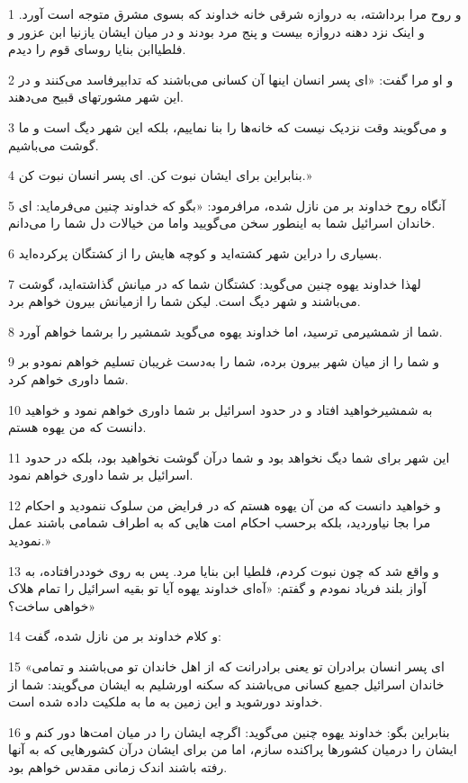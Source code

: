 \par 1 و روح مرا برداشته، به دروازه شرقی خانه خداوند که بسوی مشرق متوجه است آورد. و اینک نزد دهنه دروازه بیست و پنج مرد بودند و در میان ایشان یازنیا ابن عزور و فلطیاابن بنایا روسای قوم را دیدم.
\par 2 و او مرا گفت: «ای پسر انسان اینها آن کسانی می‌باشند که تدابیرفاسد می‌کنند و در این شهر مشورتهای قبیح می‌دهند.
\par 3 و می‌گویند وقت نزدیک نیست که خانه‌ها را بنا نماییم، بلکه این شهر دیگ است و ما گوشت می‌باشیم.
\par 4 بنابراین برای ایشان نبوت کن. ای پسر انسان نبوت کن.»
\par 5 آنگاه روح خداوند بر من نازل شده، مرافرمود: «بگو که خداوند چنین می‌فرماید: ای خاندان اسرائیل شما به اینطور سخن می‌گویید واما من خیالات دل شما را می‌دانم.
\par 6 بسیاری را دراین شهر کشته‌اید و کوچه هایش را از کشتگان پرکرده‌اید.
\par 7 لهذا خداوند یهوه چنین می‌گوید: کشتگان شما که در میانش گذاشته‌اید، گوشت می‌باشند و شهر دیگ است. لیکن شما را ازمیانش بیرون خواهم برد.
\par 8 شما از شمشیرمی ترسید، اما خداوند یهوه می‌گوید شمشیر را برشما خواهم آورد.
\par 9 و شما را از میان شهر بیرون برده، شما را به‌دست غریبان تسلیم خواهم نمودو بر شما داوری خواهم کرد.
\par 10 به شمشیرخواهید افتاد و در حدود اسرائیل بر شما داوری خواهم نمود و خواهید دانست که من یهوه هستم.
\par 11 این شهر برای شما دیگ نخواهد بود و شما درآن گوشت نخواهید بود، بلکه در حدود اسرائیل بر شما داوری خواهم نمود.
\par 12 و خواهید دانست که من آن یهوه هستم که در فرایض من سلوک ننمودید و احکام مرا بجا نیاوردید، بلکه برحسب احکام امت هایی که به اطراف شمامی باشند عمل نمودید.»
\par 13 و واقع شد که چون نبوت کردم، فلطیا ابن بنایا مرد. پس به روی خوددر‌افتاده، به آواز بلند فریاد نمودم و گفتم: «آه‌ای خداوند یهوه آیا تو بقیه اسرائیل را تمام هلاک خواهی ساخت؟»
\par 14 و کلام خداوند بر من نازل شده، گفت:
\par 15 «ای پسر انسان برادران تو یعنی برادرانت که از اهل خاندان تو می‌باشند و تمامی خاندان اسرائیل جمیع کسانی می‌باشند که سکنه اورشلیم به ایشان می‌گویند: شما از خداوند دورشوید و این زمین به ما به ملکیت داده شده است.
\par 16 بنابراین بگو: خداوند یهوه چنین می‌گوید: اگرچه ایشان را در میان امت‌ها دور کنم و ایشان را درمیان کشورها پراکنده سازم، اما من برای ایشان درآن کشورهایی که به آنها رفته باشند اندک زمانی مقدس خواهم بود.
